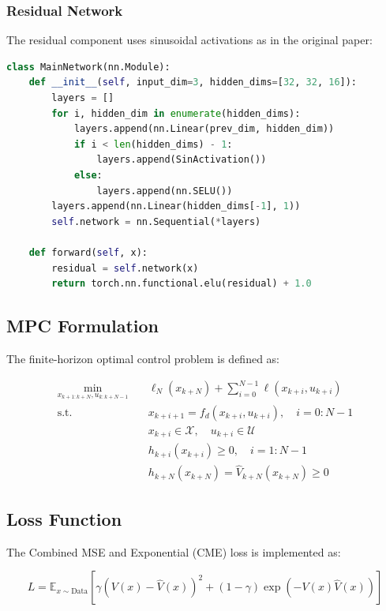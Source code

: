 \documentclass[12pt,a4paper]{article}
\begin{document}
\subsubsection{Residual Network}
The residual component uses sinusoidal activations as in the original paper:

\begin{lstlisting}[language=Python, caption=Residual Network Architecture]
class MainNetwork(nn.Module):
    def __init__(self, input_dim=3, hidden_dims=[32, 32, 16]):
        layers = []
        for i, hidden_dim in enumerate(hidden_dims):
            layers.append(nn.Linear(prev_dim, hidden_dim))
            if i < len(hidden_dims) - 1:
                layers.append(SinActivation())
            else:
                layers.append(nn.SELU())
        layers.append(nn.Linear(hidden_dims[-1], 1))
        self.network = nn.Sequential(*layers)
    
    def forward(self, x):
        residual = self.network(x)
        return torch.nn.functional.elu(residual) + 1.0
\end{lstlisting}

\subsection{MPC Formulation}
The finite-horizon optimal control problem is defined as:

\begin{align}
\min_{x_{k+1:k+N}, u_{k:k+N-1}} & \quad \ell_N(x_{k+N}) + \sum_{i=0}^{N-1} \ell(x_{k+i}, u_{k+i}) \\
\text{s.t.} & \quad x_{k+i+1} = f_d(x_{k+i}, u_{k+i}), \quad i=0:N-1 \\
& \quad x_{k+i} \in \mathcal{X}, \quad u_{k+i} \in \mathcal{U} \\
& \quad h_{k+i}(x_{k+i}) \geq 0, \quad i=1:N-1 \\
& \quad h_{k+N}(x_{k+N}) = \hat{V}_{k+N}(x_{k+N}) \geq 0
\end{align}

\subsection{Loss Function}
The Combined MSE and Exponential (CME) loss is implemented as:

\begin{equation}
L = \mathbb{E}_{x \sim \text{Data}} \left[ \gamma(V(x) - \hat{V}(x))^2 + (1-\gamma)\exp\left(-V(x)\hat{V}(x)\right) \right]
\end{equation}
\end{document}
